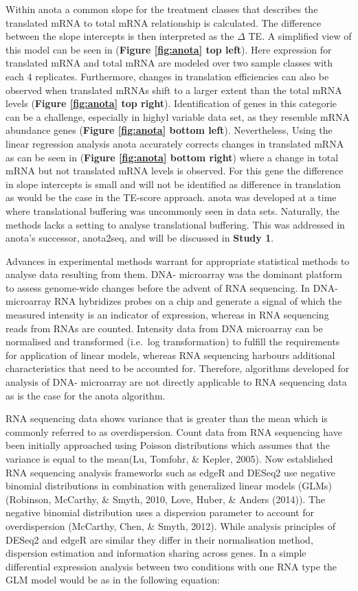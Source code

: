 \documentclass[12pt,openany]{book}
\begin{document}
Within anota a common slope for the treatment classes that describes the
translated mRNA to total mRNA relationship is calculated. The difference
between the slope intercepts is then interpreted as the \(\varDelta\)
TE. A simplified view of this model can be seen in (\textbf{Figure
\ref{fig:anota} top left}). Here expression for translated mRNA and
total mRNA are modeled over two sample classes with each 4 replicates.
Furthermore, changes in translation efficiencies can also be observed
when translated mRNAs shift to a larger extent than the total mRNA
levels (\textbf{Figure \ref{fig:anota} top right}). Identification of
genes in this categorie can be a challenge, especially in highyl
variable data set, as they resemble mRNA abundance genes (\textbf{Figure
\ref{fig:anota} bottom left}). Nevertheless, Using the linear regression
analysis anota accurately corrects changes in translated mRNA as can be
seen in (\textbf{Figure \ref{fig:anota} bottom right}) where a change in
total mRNA but not translated mRNA levels is observed. For this gene the
difference in slope intercepts is small and will not be identified as
difference in translation as would be the case in the TE-score approach.
anota was developed at a time where translational buffering was
uncommonly seen in data sets. Naturally, the methods lacks a setting to
analyse translational buffering. This was addressed in anota's
successor, anota2seq, and will be discussed in \textbf{Study 1}.

Advances in experimental methods warrant for appropriate statistical
methods to analyse data resulting from them. DNA- microarray was the
dominant platform to assess genome-wide changes before the advent of RNA
sequencing. In DNA- microarray RNA hybridizes probes on a chip and
generate a signal of which the measured intensity is an indicator of
expression, whereas in RNA sequencing reads from RNAs are counted.
Intensity data from DNA microarray can be normalised and transformed
(i.e.~log transformation) to fulfill the requirements for application of
linear models, whereas RNA sequencing harbours additional
characteristics that need to be accounted for. Therefore, algorithms
developed for analysis of DNA- microarray are not directly applicable to
RNA sequencing data as is the case for the anota algorithm.

RNA sequencing data shows variance that is greater than the mean which
is commonly referred to as overdispersion. Count data from RNA
sequencing have been initially approached using Poisson distributions
which assumes that the variance is equal to the mean(Lu, Tomfohr, \&
Kepler, 2005). Now established RNA sequencing analysis frameworks such
as edgeR and DESeq2 use negative binomial distributions in combination
with generalized linear models (GLMs) (Robinson, McCarthy, \& Smyth,
2010, Love, Huber, \& Anders (2014)). The negative binomial distribution
uses a dispersion parameter to account for overdispersion (McCarthy,
Chen, \& Smyth, 2012). While analysis principles of DESeq2 and edgeR are
similar they differ in their normalisation method, dispersion estimation
and information sharing across genes. In a simple differential
expression analysis between two conditions with one RNA type the GLM
model would be as in the following equation:
\end{document}
